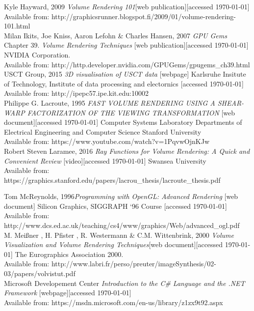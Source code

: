 \documentclass[twoside, english, 11pt]{report}
\begin{document}
\small Kyle Hayward, 2009 \textit{Volume Rendering 101}[web publication][accessed \today]
Available from: http://graphicsrunner.blogspot.fi/2009/01/volume-rendering-101.html\\

\small Milan Ikits, Joe Kniss, Aaron Lefohn \& Charles Hansen, 2007 \textit{GPU Gems} Chapter 39. \textit{Volume Rendering Techniques} [web publication][accessed \today] NVIDIA Corporation.\\
Available from: http://http.developer.nvidia.com/GPUGems/gpugems\_ch39.html\\

\small USCT Group, 2015 \textit{3D visualisation of USCT data} [webpage] Karlsruhe Insitute of Technology, Institute of data processing and electornics [accessed \today] \\
Available from: http://ipepc57.ipe.kit.edu:10002\\

\small Philippe G. Lacroute, 1995 \textit{FAST VOLUME RENDERING USING A SHEAR-WARP FACTORIZATION OF THE VIEWING TRANSFORMATION} [web document][accessed \today] Computer Systems Laboratory
Departments of Electrical Engineering and Computer Science Stanford University \\
Available from: https://www.youtube.com/watch?v=1PqvwOjnKJw\\

\small Robert Steven Laramee, 2016 \textit{Ray Functions for Volume Rendering: A Quick and Convenient Review} [video][accessed \today] Swansea University \\
Available from: https://graphics.stanford.edu/papers/lacrou\_thesis/lacroute\_thesis.pdf\

\small Tom McReynolds, 1996\textit{Programming with OpenGL: Advanced Rendering} [web document] Silicon Graphics, SIGGRAPH ‘96 Course [accessed \today] \\
Available from: http://www.dcs.ed.ac.uk/teaching/cs4/www/graphics/Web/advanced\_ogl.pdf\\

\small M. Meißner , H. Pfister , R. Westermann \& C.M. Wittenbrink, 2000 \textit{Volume Visualization and Volume Rendering Techniques}[web document][accessed \today] The Eurographics Association 2000.\\
Available from: http://www.labri.fr/perso/preuter/imageSynthesis/02-03/papers/volvistut.pdf\\

\small Microsoft Developement Center \textit{Introduction to the C\# Language and the .NET Framework} [webpage][accessed \today] \\
Available from: https://msdn.microsoft.com/en-us/library/z1zx9t92.aspx\\
\end{document}

